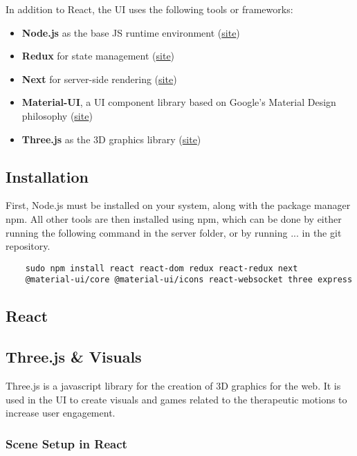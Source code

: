 \documentclass{article}
\begin{document}
	In addition to React, the UI uses the following tools or frameworks: 
	
	\begin{itemize}
		\item \textbf{Node.js} as the base JS runtime environment (\href{https://nodejs.org/en/}{site})
		\item \textbf{Redux} for state management (\href{https://redux.js.org/}{site})
		\item \textbf{Next} for server-side rendering (\href{https://nextjs.org/}{site})
		\item \textbf{Material-UI}, a UI component library based on Google's Material Design philosophy (\href{https://material-ui.com/}{site})
		\item \textbf{Three.js} as the 3D graphics library (\href{https://threejs.org/}{site})
	\end{itemize}
	
	\subsection{Installation}
	
	First, Node.js must be installed on your system, along with the package manager npm. All other tools are then installed using npm, which can be done by either running the following command in the server folder, or by running ... in the git repository.
	
	\begin{verbatim}
	sudo npm install react react-dom redux react-redux next 
	@material-ui/core @material-ui/icons react-websocket three express
	\end{verbatim}
	
	\subsection{React}
	
	\subsection{Three.js \& Visuals}
	
	Three.js is a javascript library for the creation of 3D graphics for the web. It is used in the UI to create visuals and games related to the therapeutic motions to increase user engagement.
	
		\subsubsection{Scene Setup in React}
			
\end{document}
